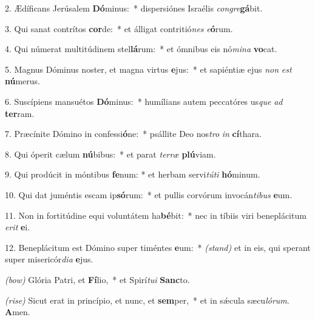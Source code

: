 2. Ædíficans Jerúsalem \textbf{Dó}minus:~*
	dispersiónes Israélis \textit{con}\textit{gre}\textbf{gá}bit.

3. Qui sanat contrítos \textbf{cor}de:~*
	et álligat contritió\textit{nes} \textit{e}\textbf{ó}rum.

4. Qui númerat multitúdinem stel\textbf{lá}rum:~*
	et ómnibus eis nó\textit{mi}\textit{na} \textbf{vo}cat.

5. Magnus Dóminus noster, et magna virtus \textbf{e}jus:~*
	et sapiéntiæ ejus \textit{non} \textit{est} \textbf{nú}merus.

6. Suscípiens mansuétos \textbf{Dó}minus:~*
	humílians autem peccatóres us\textit{que} \textit{ad} \textbf{ter}ram.

7. Præcínite Dómino in confessi\textbf{ó}ne:~*
	psállite Deo nos\textit{tro} \textit{in} \textbf{cí}thara.

8. Qui óperit cælum \textbf{nú}bibus:~*
	et parat \textit{ter}\textit{ræ} \textbf{plú}viam.

9. Qui prodúcit in móntibus \textbf{fe}num: *
	et herbam servi\textit{tú}\textit{ti} \textbf{hó}minum.

10. Qui dat juméntis escam ip\textbf{só}\-rum:~*
	et pullis corvórum invocán\textit{ti}\textit{bus} \textbf{e}um.

11. Non in fortitúdine equi voluntátem ha\textbf{bé}bit:~*
	nec in tíbiis viri beneplácitum \textit{e}\textit{rit} \textbf{e}i.

12. Beneplácitum est Dómino super timéntes \textbf{e}um:~* {\color{red}\textit{(stand)}}
	et in eis, qui sperant super misericór\textit{di}\textit{a} \textbf{e}jus.

{\color{red}\textit{(bow)}} Glória Patri, et \textbf{Fí}lio,~*
	et Spirí\textit{tu}\textit{i} \textbf{Sanc}to.

{\color{red}\textit{(rise)}} Sicut erat in princípio, et nunc, et \textbf{sem}per,~*
	et in s\'{\ae}cula sæcu\textit{ló}\textit{rum}. \textbf{A}men.